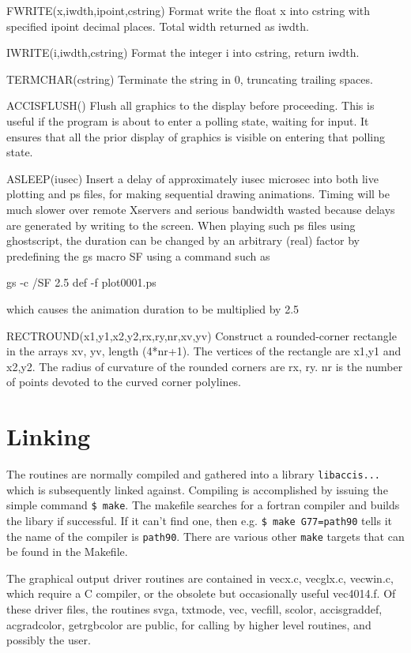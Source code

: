 \documentclass[12pt]{article}
\begin{document}
FWRITE(x,iwdth,ipoint,cstring) Format write the float x into cstring
with specified ipoint decimal places. Total width returned as iwdth.

IWRITE(i,iwdth,cstring) Format the integer i into cstring, return iwdth.

TERMCHAR(cstring) Terminate the string in 0, truncating trailing spaces.

ACCISFLUSH() Flush all graphics to the display before proceeding. This
is useful if the program is about to enter a polling state, waiting
for input. It ensures that all the prior display of graphics is visible on
entering that polling state.

ASLEEP(iusec) Insert a delay of approximately iusec microsec into both
live plotting and ps files, for making sequential drawing animations.
Timing will be much slower over remote Xservers and serious bandwidth
wasted because delays are generated by writing to the screen. When
playing such ps files using ghostscript, the duration can be changed
by an arbitrary (real) factor by predefining the gs macro SF using a
command such as

gs -c /SF 2.5 def -f plot0001.ps

which causes the animation duration to be multiplied by 2.5

RECTROUND(x1,y1,x2,y2,rx,ry,nr,xv,yv) Construct a rounded-corner
rectangle in the arrays xv, yv, length (4*nr+1). The vertices of the
rectangle are x1,y1 and x2,y2. The radius of curvature of the rounded
corners are rx, ry. nr is the number of points devoted to the curved
corner polylines.


\section{Linking}

The routines are normally compiled and gathered into a library
\verb!libaccis...! which is subsequently linked against. Compiling is
accomplished by issuing the simple command \verb!$ make!. The makefile
searches for a fortran compiler and builds the libary if
successful. If it can't find one, then e.g. \verb!$ make G77=path90!
tells it the name of the compiler is \verb!path90!. There are various
other \verb!make! targets that can be found in the Makefile.

The graphical output driver routines are contained in vecx.c,
vecglx.c, vecwin.c, which require a C compiler, or the obsolete but
occasionally useful vec4014.f. Of these driver files, the routines
svga, txtmode, vec, vecfill, scolor, accisgraddef, acgradcolor,
getrgbcolor are public, for calling by higher level routines, and
possibly the user.
\end{document}
